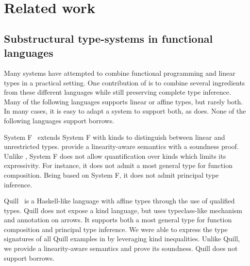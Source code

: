 \section{Related work}
\label{sec:related-work}





\subsection{Substructural type-systems in functional languages}

Many systems have attempted to combine
functional programming and linear types in a practical setting.
One contribution of \lang is to combine several ingredients
from these different languages while still preserving
complete type inference.
Many of the following languages supports linear or affine types, but rarely
both. In many cases, it is easy to adapt a system to support both, as
\lang does.
None of the following languages support borrows.

System F\degree~\citep{DBLP:conf/tldi/MazurakZZ10}
extends System F with kinds to distinguish
between linear and unrestricted types.
\citet{DBLP:conf/tldi/MazurakZZ10} provide
a linearity-aware semantics with a soundness proof.
Unlike \lang, System F\degree{} does not allow
quantification over kinds which limits its expressivity. For instance, it
does not admit a most general type for function composition.
Being based on System F, it does not admit
principal type inference.

Quill~\citep{DBLP:conf/icfp/Morris16} is a Haskell-like language with affine
types through the use of qualified types.
Quill does not expose a kind language, but
uses typeclass-like mechanism and annotation on arrows.
It supports both a most general type for function composition and
principal type inference.
We were able to express the type signatures of all Quill examples
in \lang by leveraging kind inequalities.
Unlike Quill,
we provide a linearity-aware semantics and prove its soundness.
Quill does not support borrows.


